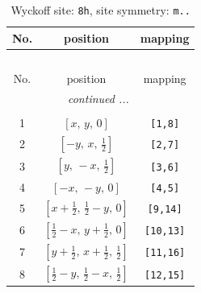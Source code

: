 \documentclass[fleqn,8pt]{jsarticle}
\begin{document}
\begin{longtable}{ccc}
\caption{Wyckoff site: {\tt 8h}, site symmetry: {\tt m..}}
 \\
 \hline \hline
No. & position & mapping \\ \hline \endfirsthead

\multicolumn{2}{l}{\tablename\ \thetable{}} \\
 \hline \hline
No. & position & mapping \\ \hline \endhead

 \hline \hline
\multicolumn{2}{r}{\footnotesize\it continued ...} \\ \endfoot

 \hline \hline
\multicolumn{2}{r}{} \\ \endlastfoot

1 & $\left[ x,\, y,\, 0 \right]$ & {\tt [1,8]} \\ \hline
2 & $\left[ - y,\, x,\, \frac{1}{2} \right]$ & {\tt [2,7]} \\ \hline
3 & $\left[ y,\, - x,\, \frac{1}{2} \right]$ & {\tt [3,6]} \\ \hline
4 & $\left[ - x,\, - y,\, 0 \right]$ & {\tt [4,5]} \\ \hline
5 & $\left[ x + \frac{1}{2},\, \frac{1}{2} - y,\, 0 \right]$ & {\tt [9,14]} \\ \hline
6 & $\left[ \frac{1}{2} - x,\, y + \frac{1}{2},\, 0 \right]$ & {\tt [10,13]} \\ \hline
7 & $\left[ y + \frac{1}{2},\, x + \frac{1}{2},\, \frac{1}{2} \right]$ & {\tt [11,16]} \\ \hline
8 & $\left[ \frac{1}{2} - y,\, \frac{1}{2} - x,\, \frac{1}{2} \right]$ & {\tt [12,15]} \\
\end{longtable}
\renewcommand{\arraystretch}{1.2}
\end{document}
